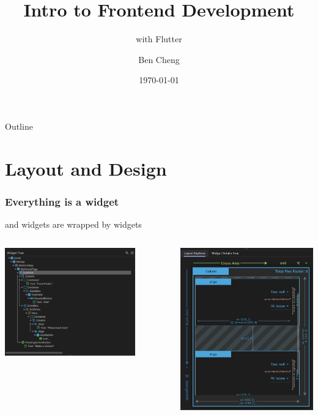 \documentclass[compress, aspectratio=32]{beamer}
\title[UI Dev]{Intro to Frontend Development}
\subtitle{with Flutter}
\author{Ben Cheng}
\institute{RISD ID}
\date{\today}
\begin{document}
\frame{\titlepage}

\begin{frame}[allowframebreaks]{Outline}
    \tableofcontents
\end{frame}

\section{Layout and Design}
\begin{frame}
    \frametitle{Everything is a widget}
    and widgets are wrapped by widgets
    \begin{columns}
        \begin{column}{0.5\textwidth}
            \centering
            \includegraphics[width=0.8\textwidth]{widgettree.png}
        \end{column}
        \begin{column}[]{0.5\textwidth}
            \centering
            \includegraphics[height=0.7\textheight]{widget.png}

\end{column}
\end{columns}
\end{frame}
\end{document}
